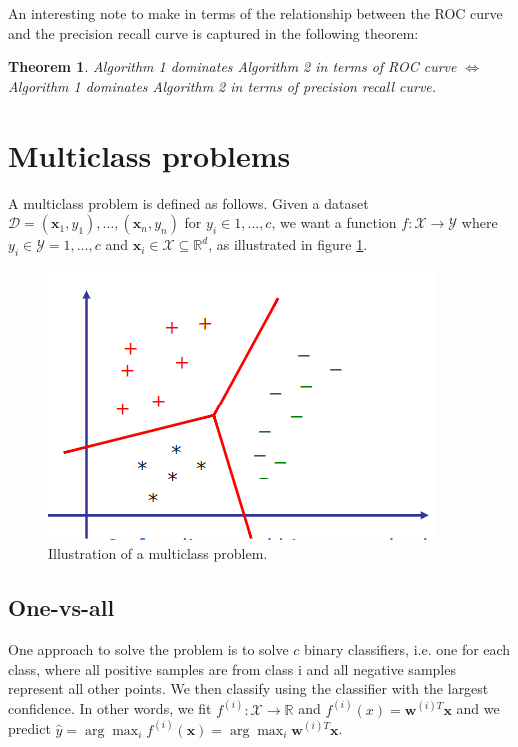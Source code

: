 \documentclass[a4paper,10pt,twoside]{article}
\newtheorem{theorem}{Theorem}
\begin{document}
An interesting note to make in terms of the relationship between the ROC curve and the precision recall curve is captured in the following theorem:

\begin{theorem}
    Algorithm 1 dominates Algorithm 2 in terms of ROC curve $\Leftrightarrow$ Algorithm 1 dominates Algorithm 2 in terms of precision recall curve.
\end{theorem}

\section{Multiclass problems}

A multiclass problem is defined as follows. Given a dataset $\mathcal{D}={(\mathbf{x}_1, y_1),\ldots, (\mathbf{x}_n, y_n)}$ for $y_i\in{1,\ldots, c}$, we want a function $f:\mathcal{X}\rightarrow \mathcal{Y}$ where $y_i\in\mathcal{Y}={1,\ldots,c}$ and $\mathbf{x}_i\in\mathcal{X}\subseteq\mathbb{R}^d$, as illustrated in figure \ref{multiclass-problem}.

\begin{figure}
    \centering
    \includegraphics[width=.5\textwidth]{figures/multiclass-problem.png}
    \caption{Illustration of a multiclass problem.}
    \label{multiclass-problem}
\end{figure}

\subsection{One-vs-all}

One approach to solve the problem is to solve $c$ binary classifiers, i.e. one for each class, where all positive samples are from class i and all negative samples represent all other points. We then classify using the classifier with the largest confidence. In other words, we fit $f^{(i)}:\mathcal{X}\rightarrow\mathbb{R}$ and $f^{(i)}(x)=\mathbf{w}^{(i)T}\mathbf{x}$ and we predict $\hat{y}=\arg\max_{i}f^{(i)}(\mathbf{x})=\arg\max_{i}\mathbf{w}^{(i)T}\mathbf{x}$.
\end{document}
